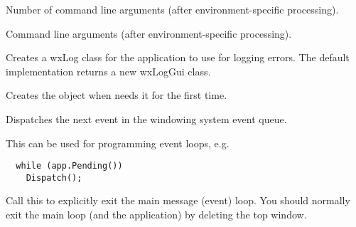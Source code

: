 Number of command line arguments (after environment-specific processing).


\label{wxappargv}


Command line arguments (after environment-specific processing).


\label{wxappcreatelogtarget}


Creates a wxLog class for the application to use for logging errors. The default
implementation returns a new wxLogGui class.




\label{wxappcreatetraits}


Creates the  object when 
needs it for the first time.




\label{wxappdispatch}


Dispatches the next event in the windowing system event queue.

This can be used for programming event loops, e.g.

\begin{verbatim}
  while (app.Pending())
    Dispatch();
\end{verbatim}




\label{wxappexitmainloop}


Call this to explicitly exit the main message (event) loop.
You should normally exit the main loop (and the application) by deleting
the top window.


\label{wxappfilterevent}


